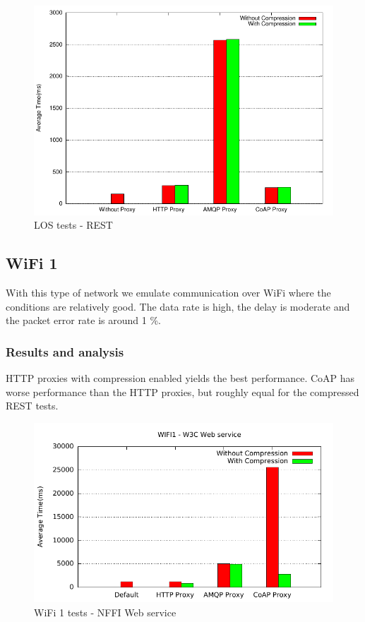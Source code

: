 \begin{figure}[H]
\center
\includegraphics[scale=0.75]{../results/los/rest/result.pdf}
\caption{LOS tests - REST}
\end{figure}



\subsection{WiFi 1}

With this type of network we emulate communication over WiFi where the
conditions are relatively good. The data rate is high, the delay is moderate
and the packet error rate is around 1 \%.

\subsubsection{Results and analysis}

HTTP proxies with compression enabled yields the best performance. CoAP has
worse performance than the HTTP proxies, but roughly equal for the compressed
REST tests.


\begin{figure}[H]
\center
\includegraphics[scale=0.75]{../results/wifi1/nffi/out.pdf}
\caption{WiFi 1 tests - NFFI Web service}
\end{figure}

